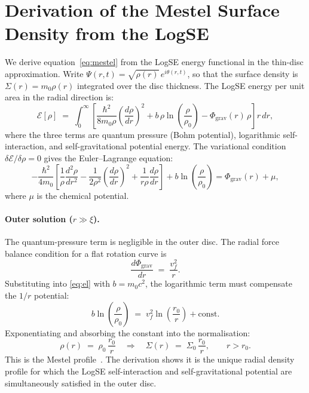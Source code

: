 \documentclass[11pt,a4paper]{article}
\begin{document}
\appendix
\section{Derivation of the Mestel Surface Density from the LogSE}
\label{app:mestel}

We derive equation~\eqref{eq:mestel} from the LogSE energy functional in the thin-disc
approximation.  Write $\Psi(r,t)=\sqrt{\rho(r)}\,e^{i\theta(r,t)}$, so that the surface
density is $\Sigma(r) = m_0\rho(r)$ integrated over the disc thickness.  The LogSE energy
per unit area in the radial direction is:
\begin{equation}
  \mathcal{E}[\rho] \;=\; \int_0^\infty \!\left[
      \frac{\hbar^2}{8m_0\rho}\!\left(\frac{d\rho}{dr}\right)^2
      + b\,\rho\ln\!\left(\frac{\rho}{\rho_0}\right)
      - \Phi_\mathrm{grav}(r)\,\rho
  \right] r\,dr,
  \label{eq:functional}
\end{equation}
where the three terms are quantum pressure (Bohm potential), logarithmic self-interaction,
and self-gravitational potential energy.  The variational condition
$\delta\mathcal{E}/\delta\rho = 0$ gives the Euler--Lagrange equation:
\begin{equation}
  -\frac{\hbar^2}{4m_0}\left[
      \frac{1}{\rho}\frac{d^2\rho}{dr^2}
      - \frac{1}{2\rho^2}\!\left(\frac{d\rho}{dr}\right)^2
      + \frac{1}{r\rho}\frac{d\rho}{dr}
  \right]
  + b\ln\!\left(\frac{\rho}{\rho_0}\right)
  = \Phi_\mathrm{grav}(r) + \mu,
  \label{eq:el}
\end{equation}
where $\mu$ is the chemical potential.

\paragraph{Outer solution ($r\gg\xi$).}
The quantum-pressure term is negligible in the outer disc.  The radial force balance
condition for a flat rotation curve is
\begin{equation}
  \frac{d\Phi_\mathrm{grav}}{dr} \;=\; \frac{v_f^2}{r}.
  \label{eq:flat_force}
\end{equation}
Substituting into \eqref{eq:el} with $b = m_0 c^2$, the logarithmic term must compensate
the $1/r$ potential:
\begin{equation}
  b\ln\!\left(\frac{\rho}{\rho_0}\right) \;=\; v_f^2\ln\!\left(\frac{r_0}{r}\right)
  + \mathrm{const}.
  \label{eq:log_balance}
\end{equation}
Exponentiating and absorbing the constant into the normalisation:
\begin{equation}
  \rho(r) \;=\; \rho_0\,\frac{r_0}{r}
  \quad\Longrightarrow\quad
  \Sigma(r) \;=\; \Sigma_0\,\frac{r_0}{r}, \qquad r > r_0.
  \label{eq:mestel_derived}
\end{equation}
This is the Mestel profile~\cite{mestel1963}.  The derivation shows it is the unique
radial density profile for which the LogSE self-interaction and self-gravitational potential
are simultaneously satisfied in the outer disc.
\end{document}
